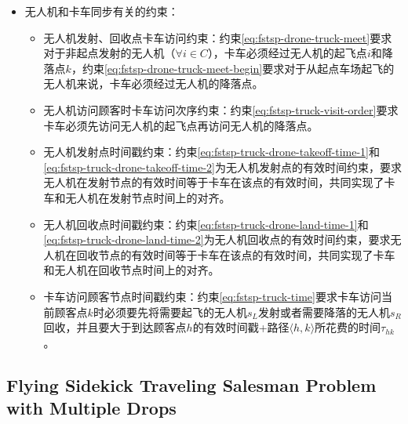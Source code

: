 \begin{itemize}
\begin{itemize}
    \end{itemize}
    \item \colorbox{shallow-yellow}{无人机和卡车同步有关的约束：}
    \begin{itemize}
        \item 无人机发射、回收点卡车访问约束：约束\ref{eq:fstsp-drone-truck-meet}要求对于非起点发射的无人机（$\forall i \in C$），卡车必须经过无人机的起飞点$i$和降落点$k$，约束\ref{eq:fstsp-drone-truck-meet-begin}要求对于从起点车场起飞的无人机来说，卡车必须经过无人机的降落点。
        \item 无人机访问顾客时卡车访问次序约束：约束\ref{eq:fstsp-truck-visit-order}要求卡车必须先访问无人机的起飞点再访问无人机的降落点。
        \item 无人机发射点时间戳约束：约束\ref{eq:fstsp-truck-drone-takeoff-time-1}和\ref{eq:fstsp-truck-drone-takeoff-time-2}为无人机发射点的有效时间约束，要求无人机在发射节点的有效时间等于卡车在该点的有效时间，共同实现了卡车和无人机在发射节点时间上的对齐。
        \item 无人机回收点时间戳约束：约束\ref{eq:fstsp-truck-drone-land-time-1}和\ref{eq:fstsp-truck-drone-land-time-2}为无人机回收点的有效时间约束，要求无人机在回收节点的有效时间等于卡车在该点的有效时间，共同实现了卡车和无人机在回收节点时间上的对齐。
        \item 卡车访问顾客节点时间戳约束：约束\ref{eq:fstsp-truck-time}要求卡车访问当前顾客点$k$时必须要先将需要起飞的无人机$s_L$发射或者需要降落的无人机$s_R$回收，并且要大于到达顾客点$h$的有效时间戳+路径$\langle h,k \rangle$所花费的时间$\tau_{hk}$。
    \end{itemize}
\end{itemize}


\subsection{Flying Sidekick Traveling Salesman Problem with Multiple Drops}
